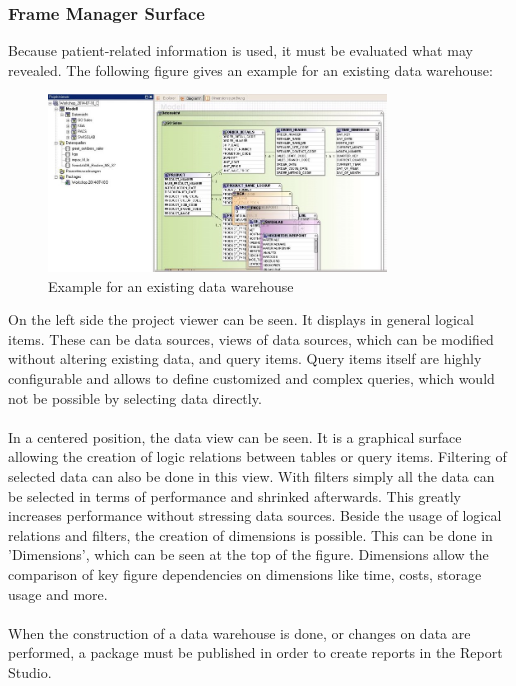 \documentclass[a4paper]{article}
\begin{document}
	\subsubsection{Frame Manager Surface}
	Because patient-related information is used, it must be evaluated what may
	revealed. The following figure gives an example for an existing
	data warehouse:
	\begin{figure}[!ht]
		  \centering
		      \includegraphics[width=0.8\textwidth]{frameworkM_2}
		  \caption{Example for an existing data warehouse}
	\end{figure}
	On the left side the project viewer can be seen. It displays in general logical
	items. These can be data sources, views of data sources, which can be modified
	without altering existing data, and query items. Query items itself are highly configurable and allows to define customized and complex
	queries, which would not be possible by selecting data directly.\\
	\\
	In a centered position, the data view can be seen. It is a graphical surface
	allowing the creation of logic relations between tables or query items.
	Filtering of selected data can also be done in this view. With filters
	simply all the data can be selected in terms of performance and shrinked
	afterwards. This greatly increases performance without stressing data sources.
	Beside the usage of logical relations and filters, the creation of
	dimensions is possible.
	This can be done in 'Dimensions', which can be seen at the top of the figure. 
	Dimensions allow the comparison of
	key figure dependencies on dimensions like time, costs, storage usage and
	more.\\
	\\
	When the construction of a data warehouse is done, or changes on data are
	performed, a package must be published in order to create reports in the Report
	Studio.
\end{document}

